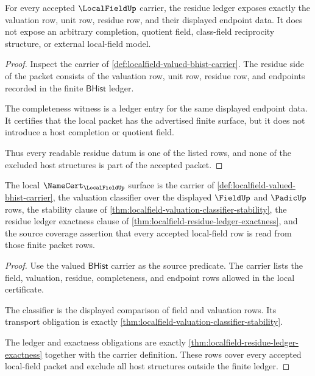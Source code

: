 \begin{theorem}
\label{thm:localfield-residue-ledger-exactness}
For every accepted $\LocalFieldUp$ carrier, the residue ledger exposes exactly
the valuation row, unit row, residue row, and their displayed endpoint data.
It does not expose an arbitrary completion, quotient field, class-field
reciprocity structure, or external local-field model.
\end{theorem}
\begin{proof}
Inspect the carrier of \autoref{def:localfield-valued-bhist-carrier}. The
residue side of the packet consists of the valuation row, unit row, residue
row, and endpoints recorded in the finite $\mathsf{BHist}$ ledger.

The completeness witness is a ledger entry for the same displayed endpoint
data. It certifies that the local packet has the advertised finite surface, but
it does not introduce a host completion or quotient field.

Thus every readable residue datum is one of the listed rows, and none of the
excluded host structures is part of the accepted packet.
\end{proof}

\begin{theorem}
\label{thm:localfield-namecert-obligation-surface}
The local $\NameCert_{\LocalFieldUp}$ surface is the carrier of
\autoref{def:localfield-valued-bhist-carrier}, the valuation classifier over
the displayed $\FieldUp$ and $\PadicUp$ rows, the stability clause of
\autoref{thm:localfield-valuation-classifier-stability}, the residue ledger
exactness clause of \autoref{thm:localfield-residue-ledger-exactness}, and the
source coverage assertion that every accepted local-field row is read from
those finite packet rows.
\end{theorem}
\begin{proof}
Use the valued $\mathsf{BHist}$ carrier as the source predicate. The carrier
lists the field, valuation, residue, completeness, and endpoint rows allowed in
the local certificate.

The classifier is the displayed comparison of field and valuation rows. Its
transport obligation is exactly
\autoref{thm:localfield-valuation-classifier-stability}.

The ledger and exactness obligations are exactly
\autoref{thm:localfield-residue-ledger-exactness} together with the carrier
definition. These rows cover every accepted local-field packet and exclude all
host structures outside the finite ledger.
\end{proof}

